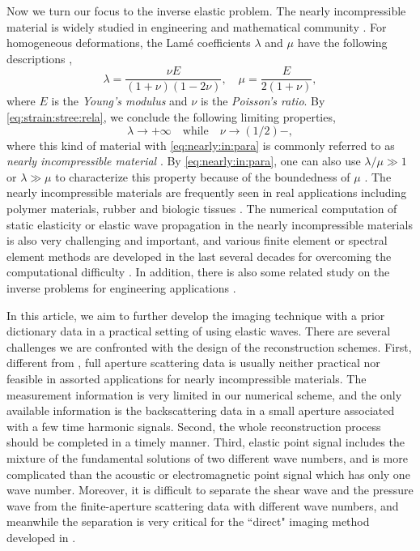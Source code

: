 \documentclass[a4paper,11pt]{article}
\theoremstyle{remark}
\theoremstyle{definition}
\numberwithin{equation}{section}
\begin{document}
Now we turn our focus to the inverse elastic problem. The nearly incompressible material is widely studied in engineering \cite{MDR,SMG} and mathematical community \cite{BM, SBC}.
For homogeneous deformations, the Lam\'{e} coefficients $\lambda$ and $\mu$ have the following descriptions \cite{LAU,SBC},
\begin{equation}\label{eq:strain:stree:rela}
\lambda  = \frac{\nu E}{(1+\nu)(1-2\nu)}, \quad \mu = \frac{E}{2(1+\nu)},
\end{equation}
where $E$ is the \emph{Young's modulus} and $\nu$ is the \emph{Poisson's ratio}. By \eqref{eq:strain:stree:rela}, we conclude the following limiting properties,
\begin{equation}\label{eq:nearly:in:para}
  \lambda \rightarrow +\infty \quad \text{while} \quad \nu \rightarrow (1/2)-,
\end{equation}
where this kind of material with \eqref{eq:nearly:in:para} is
commonly referred to as \emph{nearly incompressible material} \cite{SBC}. By \eqref{eq:nearly:in:para}, one can also use $\lambda/\mu \gg 1$ or $\lambda \gg \mu$ to characterize this property because of the boundedness of $\mu$ \cite{BLP}. The nearly incompressible materials are frequently seen in real applications including polymer materials, rubber and biologic tissues \cite{YT, MRR, MDR, KV}. The numerical computation of static elasticity or elastic wave propagation in the nearly incompressible materials is also very challenging and important, and various finite element or spectral element methods are developed in the last several decades for overcoming the computational difficulty \cite{SBC, BLP,BM, SMG}. In addition, there is also some related study on the inverse problems for engineering applications \cite{KV}.

In this article, we aim to further develop the imaging technique with a prior dictionary data in a practical setting of using elastic waves. There are several challenges we are confronted with the design of the reconstruction schemes. First, different from \cite{HLLS}, full aperture scattering data is usually neither practical nor feasible in assorted applications for nearly incompressible materials. The measurement information is very limited  in our numerical scheme, and the only available information is the backscattering data in a small aperture associated with a few time harmonic signals. Second, the whole reconstruction process should be completed in a timely manner. Third, elastic point signal includes the mixture of the fundamental solutions of two different wave numbers, and is more complicated than the acoustic or electromagnetic point signal which has only one wave number. Moreover, it is difficult to separate the shear wave and the pressure wave from the finite-aperture scattering data with different wave numbers, and meanwhile the separation is very critical for the ``direct" imaging method developed in \cite{LWY}.
\end{document}
